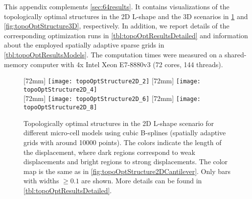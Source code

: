 \label{chap:a30topoOptDetails}

\noindent
This appendix complements \cref{sec:64results}.
It contains visualizations of the topologically optimal structures
in the 2D L-shape and the 3D scenarios in
\cref{fig:topoOptStructure2DLShape} and \cref{fig:topoOptStructure3D},
respectively.
In addition, we report details of the corresponding optimization runs
in \cref{tbl:topoOptResultsDetailed} and
information about the employed spatially adaptive sparse grids in
\cref{tbl:topoOptResultsModels}.
The computation times were measured on a shared-memory computer
with 4x Intel Xeon E7-8880v3 (72 cores, 144 threads).

\begin{figure}
  [72mm]{%
    \texttt{[image: topoOptStructure2D\_2]}%
  }%
  \hfill%
  [72mm]{%
    \texttt{[image: topoOptStructure2D\_4]}%
  }%
  \\[2mm]%
  [72mm]{%
    \texttt{[image: topoOptStructure2D\_6]}%
  }%
  \hfill%
  [72mm]{%
    \texttt{[image: topoOptStructure2D\_8]}%
  }%
  \caption[Optimal structures in the 2D L-shape scenario]{%
    Topologically optimal structures in the 2D L-shape scenario
    for different micro-cell models using cubic B-splines
    (spatially adaptive grids with around \num{10000} points).
    The colors indicate the length of the displacement,
    where dark regions correspond to weak displacements and
    bright regions to strong displacements.
    The color map is the same as in
    \cref{fig:topoOptStructure2DCantilever}.
    Only bars with widths $\ge 0.1$ are shown.
    More details can be found in \cref{tbl:topoOptResultsDetailed}.%
  }%
  \label{fig:topoOptStructure2DLShape}%
\end{figure}


